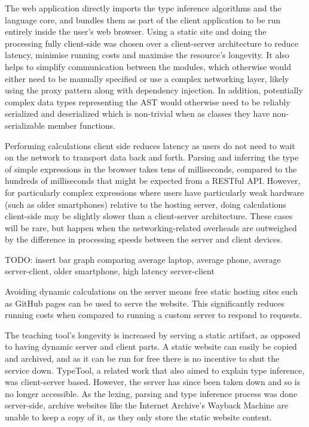 \documentclass[a4paper,fleqn,oneside,12pt]{report}
\begin{document}
The web application directly imports the type inference algorithms and the language core, and bundles them as part of the client application to be run entirely inside the user’s web browser. Using a static site and doing the processing fully client-side was chosen over a client-server architecture to reduce latency, minimise running costs and maximise the resource’s longevity. It also helps to simplify communication between the modules, which otherwise would either need to be manually specified or use a complex networking layer, likely using the proxy pattern along with dependency injection. In addition, potentially complex data types representing the AST would otherwise need to be reliably serialized and deserialized which is non-trivial when as classes they have non-serializable member functions.

Performing calculations client side reduces latency as users do not need to wait on the network to transport data back and forth. Parsing and inferring the type of simple expressions in the browser takes tens of milliseconds, compared to the hundreds of milliseconds that might be expected from a RESTful API. However, for particularly complex expressions where users have particularly weak hardware (such as older smartphones) relative to the hosting server, doing calculations client-side may be slightly slower than a client-server architecture. These cases will be rare, but happen when the networking-related overheads are outweighed by the difference in processing speeds between the server and client devices.

TODO: insert bar graph comparing average laptop, average phone, average server-client, older smartphone, high latency server-client

Avoiding dynamic calculations on the server means free static hosting sites such as GitHub pages can be used to serve the website. This significantly reduces running costs when compared to running a custom server to respond to requests.

The teaching tool’s longevity is increased by serving a static artifact, as opposed to having dynamic server and client parts. A static website can easily be copied and archived, and as it can be run for free there is no incentive to shut the service down. TypeTool, a related work that also aimed to explain type inference, was client-server based. However, the server has since been taken down and so is no longer accessible. As the lexing, parsing and type inference process was done server-side, archive websites like the Internet Archive’s Wayback Machine are unable to keep a copy of it, as they only store the static website content.
\end{document}
